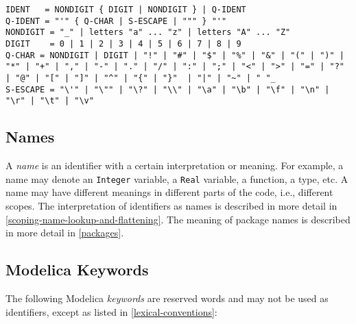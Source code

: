 \begin{lstlisting}[language=grammar]
IDENT   = NONDIGIT { DIGIT | NONDIGIT } | Q-IDENT
Q-IDENT = "'" { Q-CHAR | S-ESCAPE | """ } "'"
NONDIGIT = "_" | letters "a" ... "z" | letters "A" ... "Z"
DIGIT    = 0 | 1 | 2 | 3 | 4 | 5 | 6 | 7 | 8 | 9
Q-CHAR = NONDIGIT | DIGIT | "!" | "#" | "$" | "%" | "&" | "(" | ")" | "*" | "+" | "," | "-" | "." | "/" | ":" | ";" | "<" | ">" | "=" | "?" | "@" | "[" | "]" | "^" | "{" | "}"  | "|" | "~" | " "_
S-ESCAPE = "\'" | "\"" | "\?" | "\\" | "\a" | "\b" | "\f" | "\n" | "\r" | "\t" | "\v"
\end{lstlisting}

\subsection{Names}

A \emph{name} is an identifier with a certain interpretation or meaning.
For example, a name may denote an \lstinline[basicstyle=\ttfamily]!Integer! variable, a \lstinline[basicstyle=\ttfamily]!Real! variable, a
function, a type, etc. A name may have different meanings in different
parts of the code, i.e., different scopes. The interpretation of
identifiers as names is described in more detail in \autoref{scoping-name-lookup-and-flattening}. The
meaning of package names is described in more detail in \autoref{packages}.

\subsection{Modelica Keywords}

The following Modelica \emph{keywords} are reserved words and may not be
used as identifiers, except as listed in \autoref{lexical-conventions}:

